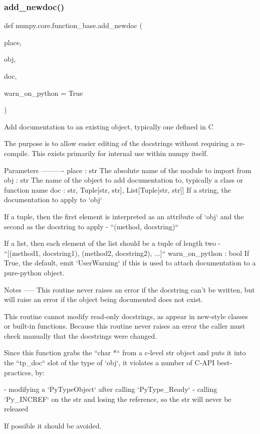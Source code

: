\subsubsection{\texorpdfstring{add\+\_\+newdoc()}{add\_newdoc()}}
{\footnotesize\ttfamily def numpy.\+core.\+function\+\_\+base.\+add\+\_\+newdoc (\begin{DoxyParamCaption}\item[{}]{place,  }\item[{}]{obj,  }\item[{}]{doc,  }\item[{}]{warn\+\_\+on\+\_\+python = {\ttfamily True} }\end{DoxyParamCaption})}

\begin{DoxyVerb}Add documentation to an existing object, typically one defined in C

The purpose is to allow easier editing of the docstrings without requiring
a re-compile. This exists primarily for internal use within numpy itself.

Parameters
----------
place : str
    The absolute name of the module to import from
obj : str
    The name of the object to add documentation to, typically a class or
    function name
doc : {str, Tuple[str, str], List[Tuple[str, str]]}
    If a string, the documentation to apply to `obj`

    If a tuple, then the first element is interpreted as an attribute of
    `obj` and the second as the docstring to apply - ``(method, docstring)``

    If a list, then each element of the list should be a tuple of length
    two - ``[(method1, docstring1), (method2, docstring2), ...]``
warn_on_python : bool
    If True, the default, emit `UserWarning` if this is used to attach
    documentation to a pure-python object.

Notes
-----
This routine never raises an error if the docstring can't be written, but
will raise an error if the object being documented does not exist.

This routine cannot modify read-only docstrings, as appear
in new-style classes or built-in functions. Because this
routine never raises an error the caller must check manually
that the docstrings were changed.

Since this function grabs the ``char *`` from a c-level str object and puts
it into the ``tp_doc`` slot of the type of `obj`, it violates a number of
C-API best-practices, by:

- modifying a `PyTypeObject` after calling `PyType_Ready`
- calling `Py_INCREF` on the str and losing the reference, so the str
  will never be released

If possible it should be avoided.
\end{DoxyVerb}
 \mbox{\label{namespacenumpy_1_1core_1_1function__base_a9807dcedd10fa5ef1b6ac11fd2b9247c}} 
